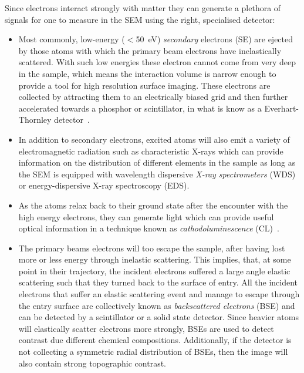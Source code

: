 Since electrons interact strongly with matter they can generate a plethora of signals for one to measure in the SEM using the right, specialised detector:
\begin{itemize}
    \item Most commonly, low-energy ($<$\SI{50}{\electronvolt}) \textit{secondary} electrons (SE) are ejected by those atoms with which the primary beam electrons have inelastically scattered. With such low energies these electron cannot come from very deep in the sample, which means the interaction volume is narrow enough to provide a tool for high resolution surface imaging. These electrons are collected by attracting them to an electrically biased grid and then further accelerated towards a phosphor or scintillator, in what is know as a Everhart-Thornley detector~\cite{ETdetector}.
    
    
    
    \item In addition to secondary electrons, excited atoms will also emit a variety of electromagnetic radiation such as characteristic X-rays which can provide information on the distribution of different elements in the sample as long as the SEM is equipped with wavelength dispersive \textit{X-ray spectrometers} (WDS) or energy-dispersive X-ray spectroscopy (EDS). 
    
    \item As the atoms relax back to their ground state after the encounter with the high energy electrons, they can generate light which can provide useful optical information in a technique known as \textit{cathodoluminescence} (CL)~\cite{Paul11}.
    
    \item The primary beams electrons will too escape the sample, after having lost more or less energy through inelastic scattering. This implies, that, at some point in their trajectory, the incident electrons suffered a large angle elastic scattering such that they turned back to the surface of entry. All the incident electrons that suffer an elastic scattering event and manage to escape through the entry surface are collectively known as \textit{backscattered electrons} (BSE) and can be detected by a scintillator or a solid state detector. Since heavier atoms will elastically scatter electrons more strongly, BSEs are used to detect contrast due different chemical compositions. Additionally, if the detector is not collecting a symmetric radial distribution of BSEs, then the image will also contain strong topographic contrast. 
    

\end{itemize}
